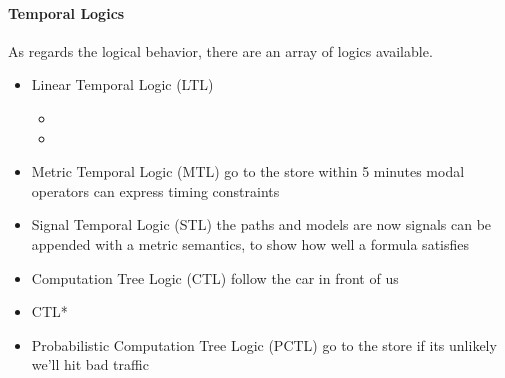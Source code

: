 \documentclass[a4paper, 11pt]{article}
\begin{document}
\paragraph{Temporal Logics}

As regards the logical behavior, there are an array of logics available.

\begin{itemize}
\item Linear Temporal Logic (LTL)
\begin{itemize}
\item 
\item
\end{itemize}
\item Metric Temporal Logic (MTL)
  go to the store within 5 minutes
  modal operators can express timing constraints
\item Signal Temporal Logic (STL)
  the paths and models are now signals
  can be appended with a metric semantics, to show how well a formula satisfies
\item Computation Tree Logic (CTL)
  follow the car in front of us 
\item CTL*
\item Probabilistic Computation Tree Logic (PCTL) 
  go to the store if its unlikely we'll hit bad traffic
\end{itemize}





\end{document}
